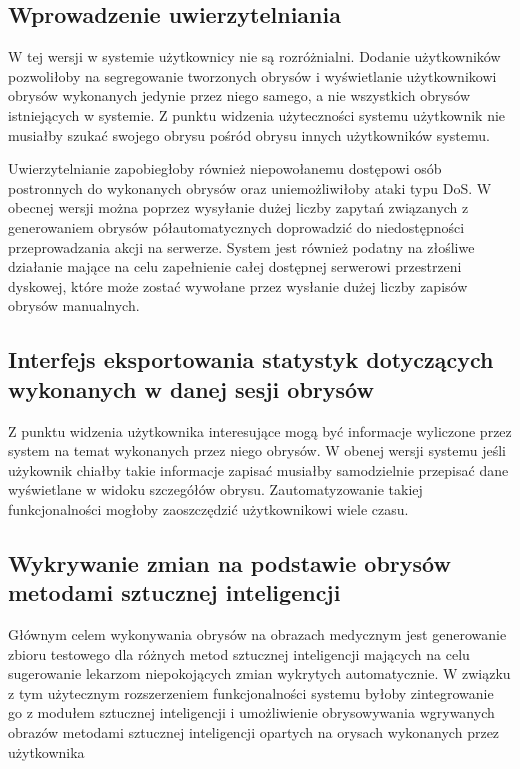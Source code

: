 \documentclass[a4paper,11pt,twoside]{report}
\theoremstyle{definition}
\begin{document}
\subsection {Wprowadzenie uwierzytelniania}

W tej wersji w systemie użytkownicy nie są rozróżnialni. Dodanie użytkowników pozwoliłoby na segregowanie tworzonych obrysów i wyświetlanie użytkownikowi obrysów wykonanych jedynie przez niego samego, a nie wszystkich obrysów istniejących w systemie. Z punktu widzenia użyteczności systemu użytkownik nie musiałby szukać swojego obrysu pośród obrysu innych użytkowników systemu. 

Uwierzytelnianie zapobiegłoby również niepowołanemu dostępowi osób postronnych do wykonanych obrysów oraz uniemożliwiłoby ataki typu DoS. W obecnej wersji można poprzez wysyłanie dużej liczby zapytań związanych z generowaniem obrysów półautomatycznych doprowadzić do niedostępności przeprowadzania akcji na serwerze. System jest również podatny na złośliwe działanie mające na celu zapełnienie całej dostępnej serwerowi przestrzeni dyskowej, które może zostać wywołane przez wysłanie dużej liczby zapisów obrysów manualnych.

\subsection {Interfejs eksportowania statystyk dotyczących wykonanych w danej sesji obrysów}

Z punktu widzenia użytkownika interesujące mogą być informacje wyliczone przez system na temat wykonanych przez niego obrysów. W obenej wersji systemu jeśli użykownik chiałby takie informacje zapisać musiałby samodzielnie przepisać dane wyświetlane w widoku szczegółów obrysu. Zautomatyzowanie takiej funkcjonalności mogłoby zaoszczędzić użytkownikowi wiele czasu.

\subsection {Wykrywanie zmian na podstawie obrysów metodami sztucznej inteligencji}

Głównym celem wykonywania obrysów na obrazach medycznym jest generowanie zbioru testowego dla różnych metod sztucznej inteligencji mających na celu sugerowanie lekarzom niepokojących zmian wykrytych automatycznie. W związku z tym użytecznym rozszerzeniem funkcjonalności systemu byłoby zintegrowanie go z modułem sztucznej inteligencji i umożliwienie obrysowywania wgrywanych obrazów metodami sztucznej inteligencji opartych na orysach wykonanych przez użytkownika
\end{document}
